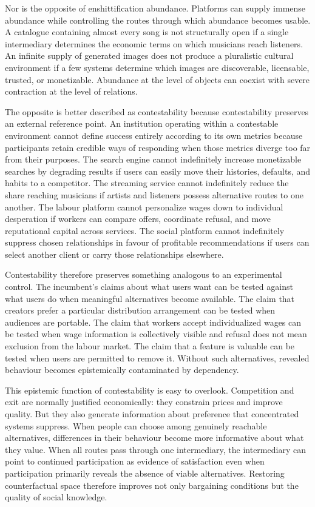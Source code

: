 \documentclass[11pt]{article}
\begin{document}
Nor is the opposite of enshittification abundance. Platforms can supply immense abundance while controlling the routes through which abundance becomes usable. A catalogue containing almost every song is not structurally open if a single intermediary determines the economic terms on which musicians reach listeners. An infinite supply of generated images does not produce a pluralistic cultural environment if a few systems determine which images are discoverable, licensable, trusted, or monetizable. Abundance at the level of objects can coexist with severe contraction at the level of relations.

The opposite is better described as contestability because contestability preserves an external reference point. An institution operating within a contestable environment cannot define success entirely according to its own metrics because participants retain credible ways of responding when those metrics diverge too far from their purposes. The search engine cannot indefinitely increase monetizable searches by degrading results if users can easily move their histories, defaults, and habits to a competitor. The streaming service cannot indefinitely reduce the share reaching musicians if artists and listeners possess alternative routes to one another. The labour platform cannot personalize wages down to individual desperation if workers can compare offers, coordinate refusal, and move reputational capital across services. The social platform cannot indefinitely suppress chosen relationships in favour of profitable recommendations if users can select another client or carry those relationships elsewhere.

Contestability therefore preserves something analogous to an experimental control. The incumbent's claims about what users want can be tested against what users do when meaningful alternatives become available. The claim that creators prefer a particular distribution arrangement can be tested when audiences are portable. The claim that workers accept individualized wages can be tested when wage information is collectively visible and refusal does not mean exclusion from the labour market. The claim that a feature is valuable can be tested when users are permitted to remove it. Without such alternatives, revealed behaviour becomes epistemically contaminated by dependency.

This epistemic function of contestability is easy to overlook. Competition and exit are normally justified economically: they constrain prices and improve quality. But they also generate information about preference that concentrated systems suppress. When people can choose among genuinely reachable alternatives, differences in their behaviour become more informative about what they value. When all routes pass through one intermediary, the intermediary can point to continued participation as evidence of satisfaction even when participation primarily reveals the absence of viable alternatives. Restoring counterfactual space therefore improves not only bargaining conditions but the quality of social knowledge.
\end{document}
